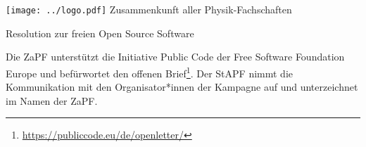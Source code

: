 \documentclass[DIV=calc]{scrartcl}
\begin{document}
\hspace{0.87\textwidth}
\begin{minipage}{120pt}
	\vspace{-1.8cm}
	\texttt{[image: ../logo.pdf]}
	\centering
	\small Zusammenkunft aller Physik-Fachschaften
\end{minipage}

\begin{center}
  \huge{Resolution zur freien Open Source Software}\vspace{.25\baselineskip}\\
  \normalsize
\end{center}
\vspace{1cm}






Die ZaPF unterstützt die Initiative Public Code der Free Software Foundation Europe und befürwortet den offenen Brief\footnote{\url{https://publiccode.eu/de/openletter/}}. 
Der StAPF nimmt die Kommunikation mit den Organisator*innen der Kampagne auf und unterzeichnet im Namen der ZaPF.
\end{document}
